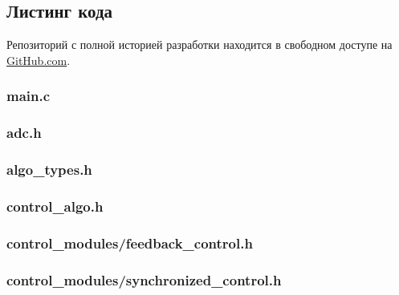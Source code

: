 \clearpage
\subsection{Листинг кода}

Репозиторий с полной историей разработки находится в свободном доступе на
\href{https://github.com/TheGreenBox/sattelite_step_drive}{GitHub.com}.

\subsubsection{main.c}
\label{module_main}


\newpage
\subsubsection{adc.h}
\label{module_adc}



\newpage
\subsubsection{algo\_types.h}
\label{module_algo_types}



\newpage
\subsubsection{control\_algo.h}
\label{module_control_algo}



\newpage
\subsubsection{control\_modules/feedback\_control.h}
\label{module_control_modules_feedback_control}



\newpage
\subsubsection{control\_modules/synchronized\_control.h}
\label{module_control_modules_synchronized_control}



